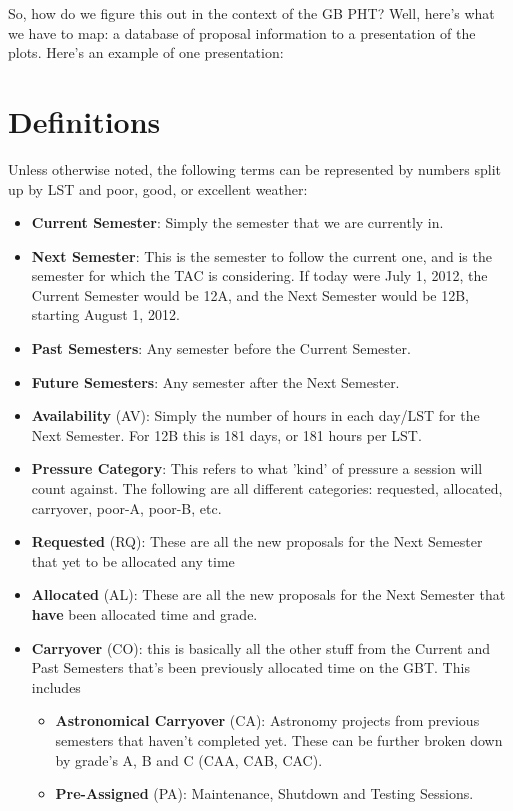 \documentclass{article}
\begin{document}
So, how do we figure this out in the context of the GB PHT? Well, here's what we have to map: a database of proposal information to a presentation of the plots. Here's an example of one presentation: 

\section{Definitions}

Unless otherwise noted, the following terms can be represented by numbers split up by LST and poor, good, or excellent weather: 


\begin{itemize}
\item {\bf Current Semester}: Simply the semester that we are currently in.
\item {\bf Next Semester}: This is the semester to follow the current one, and is the semester for which the TAC is considering.  If today were July 1, 2012, the Current Semester would be 12A, and the Next Semester would be 12B, starting August 1, 2012. 
\item {\bf Past Semesters}: Any semester before the Current Semester.
\item {\bf Future Semesters}: Any semester after the Next Semester.
\item {\bf Availability} (AV): Simply the number of hours in each day/LST for the Next Semester. For 12B this is 181 days, or 181 hours per LST.   
\item {\bf Pressure Category}: This refers to what 'kind' of pressure a session will count against. The following are all different categories: requested, allocated, carryover, poor-A, poor-B, etc.   
\item {\bf Requested} (RQ): These are all the new proposals for the Next Semester that yet to be allocated any time 
\item {\bf Allocated} (AL): These are all the new proposals for the Next Semester that {\bf have} been allocated time and grade.  
\item {\bf Carryover} (CO): this is basically all the other stuff from the Current and Past Semesters that's been previously allocated time on the GBT. This includes
\begin{itemize}
\item {\bf Astronomical Carryover} (CA): Astronomy projects from previous semesters that haven't completed yet.  These can be further broken down by grade's A, B and C (CAA, CAB, CAC). 
\item {\bf Pre-Assigned} (PA): Maintenance, Shutdown and Testing Sessions.


\end{itemize}
\end{itemize}
\end{document}
